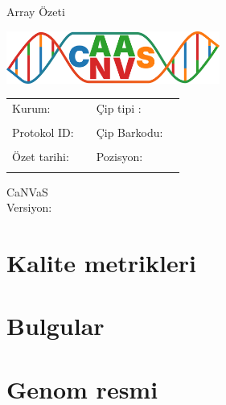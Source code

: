 \documentclass{article}
\newcommand{\institute}{
}
\newcommand{\protocolId}{
}
\newcommand{\summaryDate}{
}
\newcommand{\chipId}{
}
\newcommand{\chipPosition}{
}
\newcommand{\chipType}{
}
\newcommand{\canvasVersion}{
}
\begin{document}
\shorthandoff{=}

\begin{titlepage}
\begin{center}
\Huge \textsf{Array Özeti}
\end{center}
\vspace*{2cm}
\begin{center}
\includegraphics[width=7cm]{canvas_logo.png}

\vspace*{4cm}

\begin{tabular}{l l l l}
\textsf{Kurum: \institute } & \hspace{1cm} & \textsf{Çip tipi : \chipType} \\ \\
\textsf{Protokol ID: \protocolId} & \hspace{1cm} & \textsf{Çip Barkodu: \chipId} \\ \\
\textsf{Özet tarihi: \summaryDate} & \hspace{1cm} & \textsf{Pozisyon: \chipPosition} \\ \\
\end{tabular}

\vspace*{3cm}

\textsf{\LARGE CaNVaS} \\[0.5cm]
\textsf{Versiyon: \canvasVersion}
\end{center}
\end{titlepage}


\section{Kalite metrikleri}


\section{Bulgular}


\section{Genom resmi}
\end{document}
